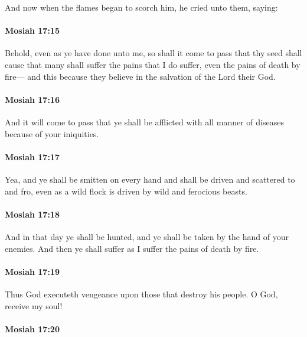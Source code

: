 			And now when the flames began to scorch him,
			he cried unto them, saying:

		\paragraph{Mosiah 17:15} %
			\label{MOSIAH-17-15}

			Behold, even as ye have done unto me,
			so shall it come to pass that
			thy seed shall cause that many shall suffer the pains that I do suffer,
			even the pains of death by fire---
			and this because they believe in the salvation of the Lord their God.

		\paragraph{Mosiah 17:16} %
			\label{MOSIAH-17-16}

			And it will come to pass that
			ye shall be afflicted with all manner of diseases because of your iniquities.

		\paragraph{Mosiah 17:17} %
			\label{MOSIAH-17-17}

			Yea, and ye shall be smitten on every hand
			and shall be driven and scattered to and fro,
			even as a wild flock is driven by wild and ferocious beasts.

		\paragraph{Mosiah 17:18} %
			\label{MOSIAH-17-18}

			And in that day ye shall be hunted,
			and ye shall be taken by the hand of your enemies.
			And then ye shall suffer as I suffer the pains of death by fire.

		\paragraph{Mosiah 17:19} %
			\label{MOSIAH-17-19}

			Thus God executeth vengeance upon those that destroy his people.
			O God, receive my soul!

		\paragraph{Mosiah 17:20} %
			\label{MOSIAH-17-20}

